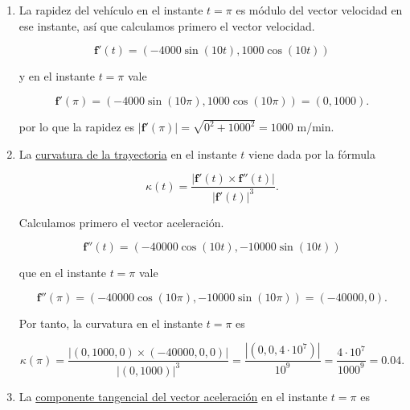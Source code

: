 \documentclass[
  spanish,
  a4paper,
]{scrreport}
\theoremstyle{definition}
\theoremstyle{remark}
\begin{document}
\begin{tcolorbox}[enhanced jigsaw, arc=.35mm, bottomrule=.15mm, bottomtitle=1mm, breakable, colback=white, colbacktitle=quarto-callout-tip-color!10!white, colframe=quarto-callout-tip-color-frame, coltitle=black, left=2mm, leftrule=.75mm, opacityback=0, opacitybacktitle=0.6, rightrule=.15mm, title=\textcolor{quarto-callout-tip-color}{\faLightbulb}\hspace{0.5em}{Solución}, titlerule=0mm, toprule=.15mm, toptitle=1mm]

\begin{enumerate}
\def\labelenumi{\alph{enumi}.}
\item
  La rapidez del vehículo en el instante \(t=\pi\) es módulo del vector
  velocidad en ese instante, así que calculamos primero el vector
  velocidad.

  \[
  \mathbf{f}'(t) = (-4000\sin(10t), 1000\cos(10t))
  \]

  y en el instante \(t=\pi\) vale

  \[
  \mathbf{f}'(\pi) = (-4000\sin(10\pi), 1000\cos(10\pi)) = (0,1000).
  \]

  por lo que la rapidez es
  \(|\mathbf{f}'(\pi)| = \sqrt{0^2+1000^2} = 1000\) m/min.
\item
  La
  \href{https://aprendeconalf.es/analisis-manual/12-funciones-vectoriales.html\#thm-curvatura-trayectoria-espacio-real}{curvatura
  de la trayectoria} en el instante \(t\) viene dada por la fórmula

  \[
  \kappa(t) = \frac{|\mathbf{f}'(t)\times \mathbf{f}''(t)|}{|\mathbf{f}'(t)|^3}.
  \]

  Calculamos primero el vector aceleración.

  \[
  \mathbf{f}''(t) = (-40000\cos(10t), -10000\sin(10t))
  \]

  que en el instante \(t=\pi\) vale

  \[
  \mathbf{f}''(\pi) = (-40000\cos(10\pi), -10000\sin(10\pi)) = (-40000,0).
  \]

  Por tanto, la curvatura en el instante \(t=\pi\) es

  \[
  \kappa(\pi) = \frac{|(0,1000,0)\times (-40000,0,0)|}{|(0,1000)|^3} = \frac{|(0,0,4\cdot 10^7)|}{10^9} = \frac{4\cdot 10^7}{1000^9} = 0.04.
  \]
\item
  La
  \href{https://aprendeconalf.es/analisis-manual/12-funciones-vectoriales.html\#def-componente-tangencial-normal-aceleracion}{componente
  tangencial del vector aceleración} en el instante \(t=\pi\) es


\end{enumerate}
\end{tcolorbox}
\end{document}

